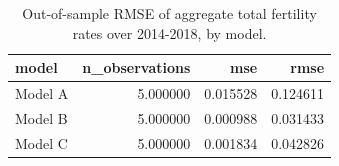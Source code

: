 \begin{table}[ht]
\centering
\begin{tabular}{lrrr}
\hline
model & n_observations & mse & rmse \\
\hline
Model A & 5.000000 & 0.015528 & 0.124611 \\
Model B & 5.000000 & 0.000988 & 0.031433 \\
Model C & 5.000000 & 0.001834 & 0.042826 \\
\hline
\end{tabular}
\caption{Out-of-sample RMSE of aggregate total fertility rates over 2014-2018, by model.}
\label{tab:new_table_e10}
\end{table}
